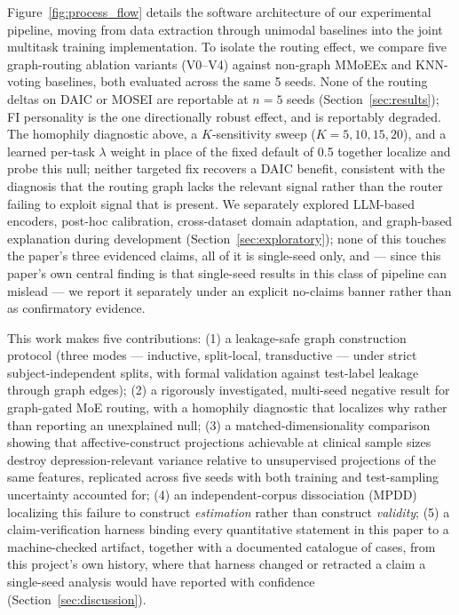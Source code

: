 \documentclass[twocolumn]{article}
\begin{document}
Figure~\ref{fig:process_flow} details the software architecture of our experimental pipeline, moving from data extraction through unimodal baselines into the joint multitask training implementation. To isolate the routing effect, we compare five graph-routing ablation variants (V0--V4) against non-graph MMoEEx and KNN-voting baselines, both evaluated across the same 5 seeds. None of the routing deltas on DAIC or MOSEI are reportable at $n{=}5$ seeds (Section~\ref{sec:results}); FI personality is the one directionally robust effect, and is reportably degraded. The homophily diagnostic above, a $K$-sensitivity sweep ($K=5,10,15,20$), and a learned per-task $\lambda$ weight in place of the fixed default of 0.5 together localize and probe this null; neither targeted fix recovers a DAIC benefit, consistent with the diagnosis that the routing graph lacks the relevant signal rather than the router failing to exploit signal that is present. We separately explored LLM-based encoders, post-hoc calibration, cross-dataset domain adaptation, and graph-based explanation during development (Section~\ref{sec:exploratory}); none of this touches the paper's three evidenced claims, all of it is single-seed only, and — since this paper's own central finding is that single-seed results in this class of pipeline can mislead — we report it separately under an explicit no-claims banner rather than as confirmatory evidence.

This work makes five contributions: (1) a leakage-safe graph construction protocol (three modes — inductive, split-local, transductive — under strict subject-independent splits, with formal validation against test-label leakage through graph edges); (2) a rigorously investigated, multi-seed negative result for graph-gated MoE routing, with a homophily diagnostic that localizes why rather than reporting an unexplained null; (3) a matched-dimensionality comparison showing that affective-construct projections achievable at clinical sample sizes destroy depression-relevant variance relative to unsupervised projections of the same features, replicated across five seeds with both training and test-sampling uncertainty accounted for; (4) an independent-corpus dissociation (MPDD) localizing this failure to construct \emph{estimation} rather than construct \emph{validity}; (5) a claim-verification harness binding every quantitative statement in this paper to a machine-checked artifact, together with a documented catalogue of cases, from this project's own history, where that harness changed or retracted a claim a single-seed analysis would have reported with confidence (Section~\ref{sec:discussion}).
\end{document}
